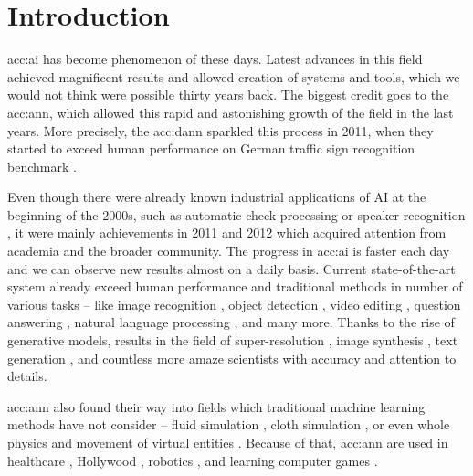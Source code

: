 \chapter{Introduction}

\acrfull{acc:ai} has become phenomenon of these days. Latest advances in this field achieved magnificent results and allowed creation of systems and tools, which we would not think were possible thirty years back. The biggest credit goes to the \acrfull{acc:ann}, which allowed this rapid and astonishing growth of the field in the last years. More precisely, the \acrfull{acc:dann} sparkled this process in 2011, when they started to exceed human performance on German traffic sign recognition benchmark \cite{CIRESAN2012333}.

Even though there were already known industrial applications of AI at the beginning of the 2000s, such as automatic check processing \cite{ChecksDocumentRecognition} or speaker recognition \cite{HECK2000181}, it were mainly achievements in 2011 and 2012 which acquired attention from academia and the broader community. The progress in \acrshort{acc:ai} is faster each day and we can observe new results almost on a daily basis. Current state-of-the-art system already exceed human performance and traditional methods in number of various tasks -- like 
image recognition \cite{pham2021meta}\cite{ZawadzkaGosk2019},
object detection \cite{ghiasi2020simple}\cite{lehner2019patch},
video editing \cite{lu2020layered},
question answering \cite{yamada2020luke}\cite{yamada2020luke},
natural language processing \cite{gpt3},
and many more. Thanks to the rise of generative models, results in the field of
super-resolution \cite{Sun_2020}\allowbreak\cite{Chadha_2020},
image synthesis \cite{StateOfTheArtImageSythesis}\allowbreak\cite{esser2020taming}\allowbreak\cite{dalle},
text generation \cite{gpt3}\allowbreak\cite{malmi2019encode},
and countless more amaze scientists with accuracy and attention to details.

\acrshort{acc:ann} also found their way into fields which traditional machine learning methods have not consider -- fluid simulation \cite{um2018liquid}\cite{Kim_2019}, cloth simulation \cite{lee2019efficient}\cite{SRBO20}, or even whole physics \cite{PhysicsSimulation}\cite{sanchezgonzalez2020learning} and movement of virtual entities \cite{PhysicsBasedCharaterSImulation}\cite{zhang2020vid2player}. Because of that, \acrshort{acc:ann} are used in 
healthcare \cite{fakoor2013using}\allowbreak\cite{BreastCancerAISystem},
Hollywood \cite{aiinhollywood},
robotics \cite{pierson2017deep}\allowbreak\cite{Lee_2020},
and learning computer games \cite{openai2019dota}\allowbreak\cite{alphastar}.

